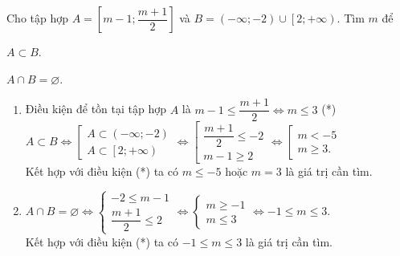 \begin{bt}%
	Cho tập hợp $ A=\left[m-1;\dfrac{m+1}{2}\right]$ và $ B=\left(-\infty ;-2\right)\cup\left[2;+\infty\right)$. Tìm $ m$ để	
	\begin{listEX}[2]
		\item $ A\subset B$.
		\item $ A\cap B=\varnothing $.
	\end{listEX}
	\loigiai
	{
		\begin{enumerate}
			\item Điều kiện để tồn tại tập hợp $ A$ là $ m-1 \le\dfrac{m+1}{2}\Leftrightarrow m \le 3$ (*)\\
			$ A\subset B\Leftrightarrow\left[\begin{array}{*{20}{c}}
				{A\subset\left(-\infty ;-2\right)}\\
				{A\subset\left[2;+\infty\right)}
			\end{array}\right.\Leftrightarrow\left[\begin{array}{*{20}{c}}
				{\dfrac{m+1}{2}\le-2}\\
				{m-1\ge 2}
			\end{array}\right.\Leftrightarrow\left[\begin{array}{*{20}{c}}
				{m <-5}\\
				{m\ge 3.}
			\end{array}\right.$\\
			Kết hợp với điều kiện (*) ta có $ m \le-5$ hoặc $m=3$ là giá trị cần tìm.
			\item $ A\cap B=\varnothing\Leftrightarrow\left\{{\begin{array}{*{20}{c}}
					{-2\le m-1}\\
					{\dfrac{m+1}{2}\le 2}
			\end{array}}\right.\Leftrightarrow\left\{{\begin{array}{*{20}{c}}
					{m\ge-1}\\
					{m \le 3}
			\end{array}}\right.\Leftrightarrow-1\le m \le 3$.\\
			Kết hợp với điều kiện (*) ta có $-1\le m \le 3$ là giá trị cần tìm.
		\end{enumerate}
	}
\end{bt}

